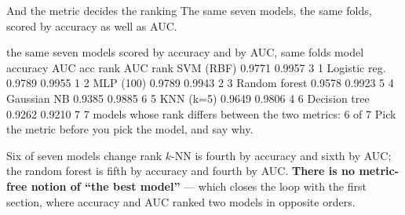 \documentclass[aspectratio=169]{beamer}
\begin{document}
\begin{frame}[fragile,shrink=8]{And the metric decides the ranking}
The same seven models, the same folds, scored by accuracy as well as AUC.
\begin{outblk}
the same seven models scored by accuracy and by AUC, same folds
model             accuracy     AUC    acc rank   AUC rank
SVM (RBF)         0.9771    0.9957       3          1
Logistic reg.     0.9789    0.9955       1          2
MLP (100)         0.9789    0.9943       2          3
Random forest     0.9578    0.9923       5          4
Gaussian NB       0.9385    0.9885       6          5
KNN (k=5)         0.9649    0.9806       4          6
Decision tree     0.9262    0.9210       7          7
models whose rank differs between the two metrics: 6 of 7
Pick the metric before you pick the model, and say why.
\end{outblk}
\begin{alertblock}{Six of seven models change rank}
  \footnotesize $k$-NN is fourth by accuracy and sixth by AUC; the random
  forest is fifth by accuracy and fourth by AUC. \textbf{There is no
  metric-free notion of ``the best model''} --- which closes the loop with the
  first section, where accuracy and AUC ranked two models in opposite orders.
\end{alertblock}
\end{frame}
\end{document}
